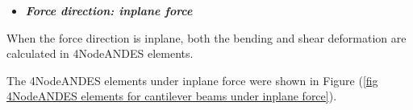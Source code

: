 \documentclass[fleqn,11pt,letter]{article}
\begin{document}







\begin{itemize}
  \item \textbf{\emph{Force direction: inplane force }}
\end{itemize}
When the force direction is inplane, both the bending and shear deformation are calculated in 4NodeANDES elements. 


The 4NodeANDES elements under inplane force were shown in Figure (\ref{fig 4NodeANDES elements for cantilever beams under inplane force}).
\end{document}
